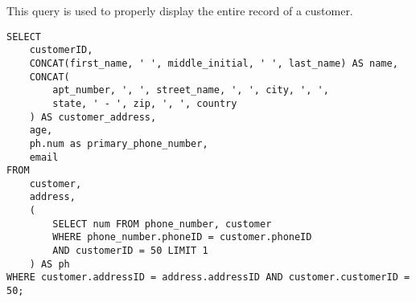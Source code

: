 This query is used to properly display the entire record of a customer.

\begin{lstlisting}
SELECT
    customerID,
    CONCAT(first_name, ' ', middle_initial, ' ', last_name) AS name,
    CONCAT(
        apt_number, ', ', street_name, ', ', city, ', ',
        state, ' - ', zip, ', ', country
    ) AS customer_address,
    age,
    ph.num as primary_phone_number,
    email
FROM
    customer,
    address,
    (
        SELECT num FROM phone_number, customer
        WHERE phone_number.phoneID = customer.phoneID
        AND customerID = 50 LIMIT 1
    ) AS ph
WHERE customer.addressID = address.addressID AND customer.customerID = 50;
\end{lstlisting}